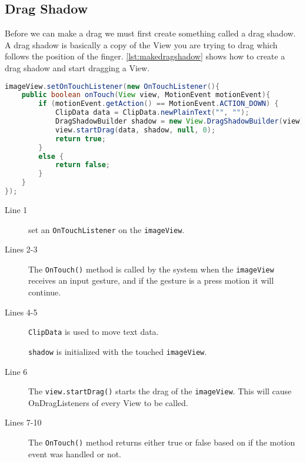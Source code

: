 \subsection*{Drag Shadow}
Before we can make a drag we must first create something called a drag shadow. A drag shadow is basically a copy of the View you are trying to drag which follows the position of the finger. \autoref{lst:makedragshadow} shows how to create a drag shadow and start dragging a View.
\begin{lstlisting}[language=java,firstnumber=1,caption={How to create a drag shadow, and start drag},label=lst:makedragshadow]
imageView.setOnTouchListener(new OnTouchListener(){
	public boolean onTouch(View view, MotionEvent motionEvent){
		if (motionEvent.getAction() == MotionEvent.ACTION_DOWN) {
			ClipData data = ClipData.newPlainText("", "");
			DragShadowBuilder shadow = new View.DragShadowBuilder(view);
			view.startDrag(data, shadow, null, 0);
			return true;
		}
		else {
			return false;
		}	
	}
});
\end{lstlisting}
\begin{description}
\item[Line 1] set an \lstinline|OnTouchListener| on the \lstinline|imageView|.
\item[Lines 2-3] The \lstinline|OnTouch()| method is called by the system when the \lstinline|imageView| receives an input gesture, and if the gesture is a press motion it will continue.
\item[Lines 4-5] \lstinline|ClipData| is used to move text data.

\lstinline|shadow| is initialized with the touched \lstinline|imageView|.

\item[Line 6] The \lstinline|view.startDrag()| starts the drag of the \lstinline|imageView|. This will cause OnDragListeners of every View to be called.

\item[Lines 7-10] The \lstinline|OnTouch()| method returns either true or false based on if the motion event was handled or not.
\end{description}
